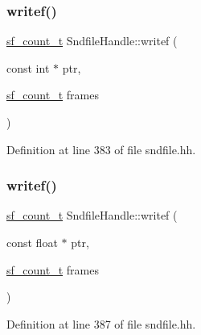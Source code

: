 \subsubsection{\texorpdfstring{writef()}{writef()}\hspace{0.1cm}{\footnotesize\ttfamily [2/4]}}
{\footnotesize\ttfamily \mbox{\hyperlink{sndfile_8h_af2b12fded74bc949f1f1f392a2af4892}{sf\+\_\+count\+\_\+t}} Sndfile\+Handle\+::writef (\begin{DoxyParamCaption}\item[{const int $\ast$}]{ptr,  }\item[{\mbox{\hyperlink{sndfile_8h_af2b12fded74bc949f1f1f392a2af4892}{sf\+\_\+count\+\_\+t}}}]{frames }\end{DoxyParamCaption})\hspace{0.3cm}{\ttfamily [inline]}}



Definition at line 383 of file sndfile.\+hh.

\mbox{\label{class_sndfile_handle_a8f862bf6d6d48246fa5cbb46464bf4c2}} 
\subsubsection{\texorpdfstring{writef()}{writef()}\hspace{0.1cm}{\footnotesize\ttfamily [3/4]}}
{\footnotesize\ttfamily \mbox{\hyperlink{sndfile_8h_af2b12fded74bc949f1f1f392a2af4892}{sf\+\_\+count\+\_\+t}} Sndfile\+Handle\+::writef (\begin{DoxyParamCaption}\item[{const float $\ast$}]{ptr,  }\item[{\mbox{\hyperlink{sndfile_8h_af2b12fded74bc949f1f1f392a2af4892}{sf\+\_\+count\+\_\+t}}}]{frames }\end{DoxyParamCaption})\hspace{0.3cm}{\ttfamily [inline]}}



Definition at line 387 of file sndfile.\+hh.

\mbox{\label{class_sndfile_handle_a96ff069df0294554fb906a8b04bad662}} 
